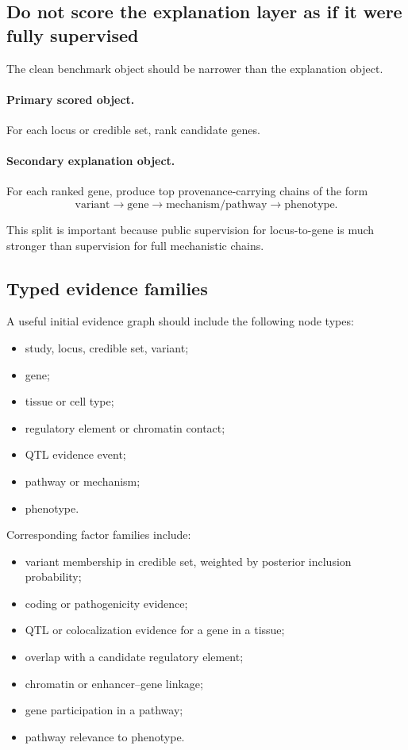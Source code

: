 \documentclass[11pt]{article}
\begin{document}
\subsection{Do not score the explanation layer as if it were fully supervised}
The clean benchmark object should be narrower than the explanation object.

\paragraph{Primary scored object.}
For each locus or credible set, rank candidate genes.

\paragraph{Secondary explanation object.}
For each ranked gene, produce top provenance-carrying chains of the form
\begin{equation}
\text{variant} \to \text{gene} \to \text{mechanism/pathway} \to \text{phenotype}.
\end{equation}

This split is important because public supervision for locus-to-gene is much stronger than supervision for full mechanistic chains.

\subsection{Typed evidence families}
A useful initial evidence graph should include the following node types:
\begin{itemize}
    \item study, locus, credible set, variant;
    \item gene;
    \item tissue or cell type;
    \item regulatory element or chromatin contact;
    \item QTL evidence event;
    \item pathway or mechanism;
    \item phenotype.
\end{itemize}

Corresponding factor families include:
\begin{itemize}
    \item variant membership in credible set, weighted by posterior inclusion probability;
    \item coding or pathogenicity evidence;
    \item QTL or colocalization evidence for a gene in a tissue;
    \item overlap with a candidate regulatory element;
    \item chromatin or enhancer--gene linkage;
    \item gene participation in a pathway;
    \item pathway relevance to phenotype.
\end{itemize}
\end{document}

